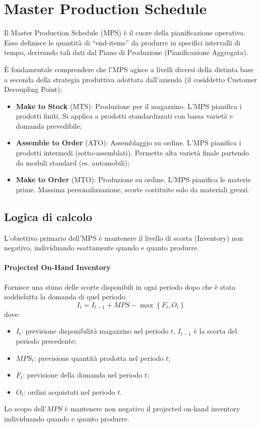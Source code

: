 %
\section{Master Production Schedule}
Il Master Production Schedule (MPS) è il cuore della pianificazione operativa. Esso definisce le quantità di ``end-items'' da produrre in specifici intervalli di tempo, derivando tali dati dal Piano di Produzione (Pianificazione Aggregata).

È fondamentale comprendere che l'MPS agisce a livelli diversi della distinta base a seconda della strategia produttiva adottata dall'azienda (il cosiddetto Customer Decoupling Point):
\begin{itemize}
    \item \textbf{Make to Stock} (MTS): Produzione per il magazzino. L'MPS pianifica i prodotti finiti. Si applica a prodotti standardizzati con bassa varietà e domanda prevedibile;
    \item \textbf{Assemble to Order} (ATO): Assemblaggio su ordine. L'MPS pianifica i prodotti intermedi (sotto-assemblati). Permette alta varietà finale partendo da moduli standard (es. automobili);
    \item \textbf{Make to Order} (MTO): Produzione su ordine. L'MPS pianifica le materie prime. Massima personalizzazione, scorte costituite solo da materiali grezzi.
\end{itemize}

%
\subsection{Logica di calcolo}
L'obiettivo primario dell'MPS è mantenere il livello di scorta (Inventory) non negativo, individuando esattamente quando e quanto produrre.

%
\paragraph{Projected On-Hand Inventory} Fornisce una stima delle scorte disponibili in ogni periodo dopo che è stata soddisfatta la domanda di quel periodo.
\[
    I_{t} = I_{t-1}+\mathit{MPS} - \max \left\{ F_{t}, O_{t} \right\}
\]
dove:
\begin{itemize}
    \item $ I_{t} $: previsione disponibilità magazzino nel periodo $ t $, $ I_{t-1} $ è la scorta del periodo precedente;
    \item $ \mathit{MPS} _{t} $: previsione quantità prodotta nel periodo $ t $;
    \item $ F_{t} $: previsione della domanda nel periodo $ t $;
    \item $ O_{t} $: ordini acquistati nel periodo $ t $.
\end{itemize}
Lo scopo dell'$ \mathit{MPS} $ è mantenere non negativo il projected on-hand
inventory individuando quando e quanto produrre.

